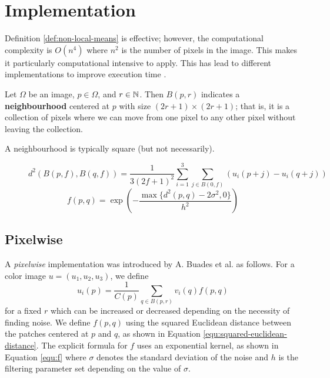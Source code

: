 \section{Implementation}

Definition \ref{def:non-local-means} is effective; however, the computational complexity is
$O(n^4)$
where $n^2$ is the number of pixels in the image. This makes it particularly computational
intensive to apply.
This has lead to different implementations to improve execution time \cite{wang2006fast}.

\begin{definition}[Neighbourhoods]
    Let $\Omega$ be an image, $p \in \Omega$, and $r \in \mathbb{N}$.
    Then
    $B(p, r)$
    indicates a \textbf{neighbourhood} centered at $p$ with size
    $(2r + 1) \times (2r + 1)$;
    that is,
    it is a collection of pixels where we can move from one pixel to any other pixel without
    leaving the collection.
\end{definition}

A neighbourhood is typically square (but not necessarily).

\begin{figure*}
    \begin{equation}
        \label{equ:squared-euclidean-distance}
        d^2(B(p, f), B(q, f)) = 
            \frac1{3(2f + 1)^2} \sum_{i = 1}^3 \sum_{j \in B(0, f)} 
            \left(u_i(p + j) - u_i(q + j)\right)
    \end{equation}
    \begin{equation} 
        \label{equ:f}
        f(p, q)               = 
            \exp{\left(-\frac{\max\{d^2(p, q) - 2\sigma^2, 0\}}{h^2}\right)}
    \end{equation}
\end{figure*}

\subsection{Pixelwise}

A \emph{pixelwise} implementation was introduced by A. Buades et al. \cite{buades2011non} as 
follows.
For a color image $u = (u_1, u_2, u_3)$, we define
\[ u_i(p) = \frac1{C(p)} \sum_{q \in B(p, r)} v_i(q) f(p, q) \]
for a fixed $r$ which can be increased or decreased depending on the necessity of finding noise.
We define $f(p, q)$ using the squared Euclidean distance between the patches centered at $p$ and 
$q$, as shown in Equation \ref{equ:squared-euclidean-distance}. The explicit formula for $f$ uses
an exponential kernel, as shown in Equation \ref{equ:f} where $\sigma$ denotes the standard deviation
of the noise and $h$ is the filtering parameter set depending on the value of $\sigma$.

